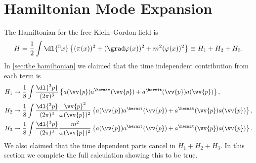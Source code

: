 \chapter{Hamiltonian Mode Expansion}\label{app:hamiltonian mode expansion}
The Hamiltonian for the free Klein--Gordon field is
\begin{equation}
    H = \frac{1}{2} \int \dl{^3x} \left\{ (\pi(x))^2 + (\grad \varphi(x))^2 + m^2(\varphi(x))^2 \right\} \equiv H_1 + H_2 + H_3.
\end{equation}
In \cref{sec:the hamiltonian} we claimed that the time independent contribution from each term is
\begin{align}
    H_1 &\to \frac{1}{8} \int \frac{\dl{^3p}}{(2\pi)^3} \left\{ a(\vv{p}) a^\hermit(\vv{p}) + a^\hermit(\vv{p})a(\vv{p}) \right\},\\
    H_2 &\to \frac{1}{8} \int \frac{\dl{^3p}}{(2\pi)^3} \frac{\vv{p}^2}{\omega(\vv{p})^2} \left\{ a(\vv{p})a^\hermit(\vv{p}) + a^\hermit(\vv{p})a(\vv{p}) \right\},\\
    H_3 &\to \frac{1}{8} \int \frac{\dl{^3p}}{(2\pi)^3} \frac{m^2}{\omega(\vv{p})^2} \left\{ a(\vv{p})a^\hermit(\vv{p}) + a^\hermit(\vv{p})a(\vv{p}) \right\}.
\end{align}
We also claimed that the time dependent parts cancel in \(H_1 + H_2 + H_3\).
In this section we complete the full calculation showing this to be true. 

